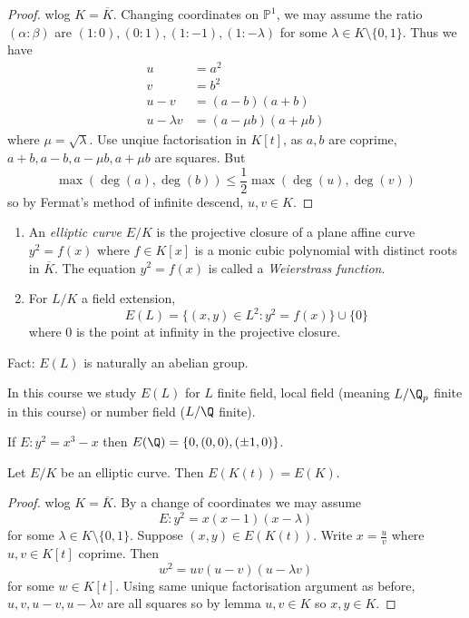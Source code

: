 \documentclass[a4paper]{article}
\theoremstyle{definition}
\theoremstyle{theorem}
\renewcommand*{\P}{\mathbb{P}}
\begin{document}
\begin{proof}
  wlog \(K = \overline K\). Changing coordinates on \(\P^1\), we may assume the ratio \((\alpha: \beta)\) are \((1: 0), (0: 1), (1: -1), (1: -\lambda)\) for some \(\lambda \in K \setminus \{0, 1\}\). Thus we have
  \begin{align*}
    u &= a^2 \\
    v &= b^2 \\
    u - v &= (a - b)(a + b) \\
    u - \lambda v &= (a - \mu b)(a + \mu b)
  \end{align*}
  where \(\mu = \sqrt \lambda\). Use unqiue factorisation in \(K[t]\),  as \(a, b\) are coprime, \(a + b, a - b, a - \mu b, a + \mu b\) are squares. But
  \[
    \max (\deg (a), \deg (b)) \leq \frac{1}{2} \max (\deg (u), \deg (v))
  \]
  so by Fermat's method of infinite descend, \(u, v \in K\).
\end{proof}

\begin{definition}\leavevmode
  \begin{enumerate}
  \item An \emph{elliptic curve} \(E/K\) is the projective closure of a plane affine curve \(y^2 = f(x)\) where \(f \in K[x]\) is a monic cubic polynomial with distinct roots in \(\overline K\). The equation \(y^2 = f(x)\) is called a \emph{Weierstrass function}.
  \item For \(L/K\) a field extension,
    \[
      E(L) = \{(x, y) \in L^2: y^2 = f(x)\} \cup \{0\}
    \]
    where \(0\) is the point at infinity in the projective closure.
  \end{enumerate}
\end{definition}

Fact: \(E(L)\) is naturally an abelian group.

In this course we study \(E(L)\) for \(L\) finite field, local field (meaning \(L/\Q_p\) finite in this course) or number field (\(L/\Q\) finite).

\begin{theorem}
  If \(E: y^2 = x^3 - x\) then \(E(\Q) = \{0, (0, 0), (\pm 1, 0)\}\).
\end{theorem}

\begin{corollary}
  Let \(E/K\) be an elliptic curve. Then \(E(K(t)) = E(K)\).
\end{corollary}

\begin{proof}
  wlog \(K = \overline K\). By a change of coordinates we may assume
  \[
    E: y^2 = x(x - 1)(x - \lambda)
  \]
  for some \(\lambda \in K \setminus \{0, 1\}\). Suppose \((x, y) \in E(K(t))\). Write \(x = \frac{u}{v}\) where \(u, v \in K[t]\) coprime. Then
  \[
    w^2 = uv(u - v)(u - \lambda v)
  \]
  for some \(w \in K[t]\). Using same unique factorisation argument as before, \(u, v, u - v, u - \lambda v\) are all squares so by lemma \(u, v \in K\) so \(x, y \in K\).
\end{proof}
\end{document}
